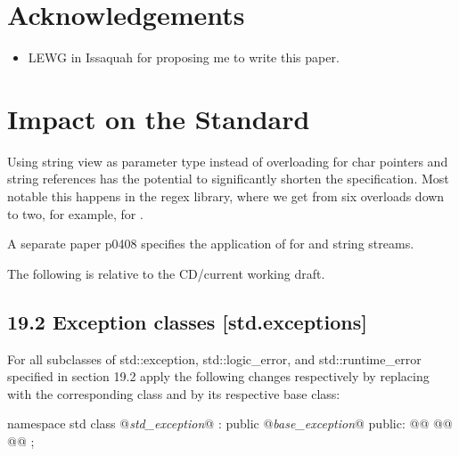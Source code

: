 \documentclass[ebook,11pt,article]{memoir}
\begin{document}
\chapter{Acknowledgements}
\begin{itemize}
\item LEWG in Issaquah for proposing me to write this paper.
\end{itemize}




\chapter{Impact on the Standard}
Using string view as parameter type instead of overloading for char pointers and string references has the potential to significantly shorten the specification. Most notable this happens in the regex library, where we get from six overloads down to two, for example, for .

A separate paper p0408 specifies the application of  for  and string streams.


The following is relative to the CD/current working draft.

\section{19.2 {Exception classes} [std.exceptions]}
For all subclasses of std::exception, std::logic_error, and std::runtime_error specified in section 19.2 apply the following changes respectively by replacing \emph{} with the corresponding class and \emph{} by its respective base class:


\begin{codeblock}
namespace std {
  class @\emph{std_exception}@ : public @\emph{base_exception}@ {
  public:
    @@
    @@
    @@
  };
}
\end{codeblock}
\end{document}
